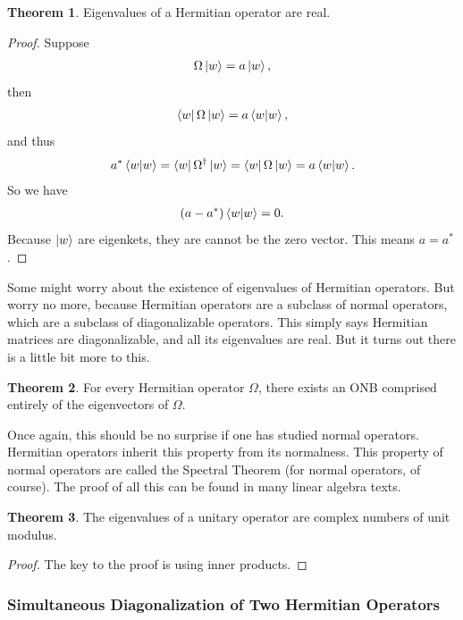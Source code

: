 \documentclass{book}
\theoremstyle{definition}
\newtheorem{thm}{Theorem}[section]
\begin{document}
\begin{thm}
	Eigenvalues of a Hermitian operator are real. 
	\begin{proof}
		Suppose 
		\begin{align}
		\Omega\ket{w} = a\ket{w},
		\end{align}
		then
		\begin{align}
		\bra{w}\Omega\ket{w} = a\braket{w},
		\end{align}
		and thus
		\begin{align}
		a^* \braket{w} = \bra{w}\Omega^\dagger\ket{w} = \bra{w}\Omega\ket{w} = a\braket{w}.
		\end{align}
		So we have
		\begin{align}
		(a - a^*)\braket{w} = 0.
		\end{align}
		Because $\ket{w}$ are eigenkets, they are cannot be the zero vector. This means $a = a^*$.
	\end{proof}
\end{thm}


Some might worry about the existence of eigenvalues of Hermitian operators. But worry no more, because Hermitian operators are a subclass of normal operators, which are a subclass of diagonalizable operators. This simply says Hermitian matrices are diagonalizable, and all its eigenvalues are real. But it turns out there is a little bit more to this. 


\begin{thm}
	For every Hermitian operator $\Omega$, there exists an ONB comprised entirely of the eigenvectors of $\Omega$. 
\end{thm}

Once again, this should be no surprise if one has studied normal operators. Hermitian operators inherit this property from its normalness. This property of normal operators are called the Spectral Theorem (for normal operators, of course). The proof of all this can be found in many linear algebra texts. 


\begin{thm}
	The eigenvalues of a unitary operator are complex numbers of unit modulus. 
	\begin{proof}
		The key to the proof is using inner products. 
	\end{proof}
\end{thm}



\subsubsection{Simultaneous Diagonalization of Two Hermitian Operators}
\end{document}
